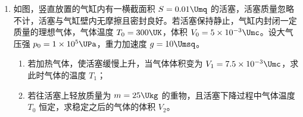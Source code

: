 \documentclass[\gkver]{gaokaozhenti}
\begin{document}
\begin{enumerate}
{\begin{enumerate}
	\item
	（如图）

	\item
	2.90，2.00

	\item
	小于，$r_{\text{测}} = \frac{(r_{\text{真}} + R_{0})R_{\mathrm{V}}}{r_{\text{真}} + R_{0} + R_{\mathrm{V}}}-R_{0}$
\end{enumerate}
}

\item
如图，竖直放置的气缸内有一横截面积 $S = 0.01 \Umq$ 的活塞，活塞质量忽略不计，活塞与气缸壁内无摩擦且密封良好。若活塞保持静止，气缸内封闭一定质量的理想气体，气体温度 $T_{0} = 300 \UK$，体积 $V_{0} = 5 \times 10^{-3} \Umc$。设大气压强 $p_{0} = 1 \times 10^{5} \UPa$，重力加速度 $g = 10 \Umsq$。

\begin{enumerate}
	\item
	若加热气体，使活塞缓慢上升，当气体体积变为 $V_{1} = 7.5 \times 10^{-3} \Umc$，求此时气体的温度 $T_{1}$；
	\item
	若往活塞上轻放质量为 $m = 25 \Ukg$ 的重物，且活塞下降过程中气体温度 $T_{0}$ 恒定，求稳定之后的气体的体积 $V_{2}$。
\end{enumerate}


\end{enumerate}
\end{document}
